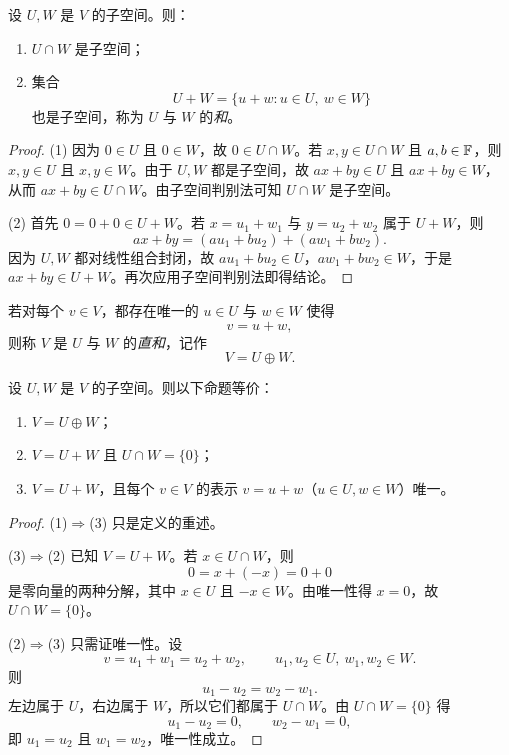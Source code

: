 \begin{proposition}
设 $U,W$ 是 $V$ 的子空间。则：
\begin{enumerate}[label=\textnormal{(\arabic*)}]
  \item $U\cap W$ 是子空间；
  \item 集合
  \[
  U+W=\{u+w:u\in U,\ w\in W\}
  \]
  也是子空间，称为 $U$ 与 $W$ 的\emph{和}。
\end{enumerate}
\end{proposition}

\begin{proof}
(1) 因为 $0\in U$ 且 $0\in W$，故 $0\in U\cap W$。若 $x,y\in U\cap W$ 且 $a,b\in\mathbb{F}$，则 $x,y\in U$ 且 $x,y\in W$。由于 $U,W$ 都是子空间，故 $ax+by\in U$ 且 $ax+by\in W$，从而 $ax+by\in U\cap W$。由子空间判别法可知 $U\cap W$ 是子空间。

(2) 首先 $0=0+0\in U+W$。若 $x=u_1+w_1$ 与 $y=u_2+w_2$ 属于 $U+W$，则
\[
ax+by=(au_1+bu_2)+(aw_1+bw_2).
\]
因为 $U,W$ 都对线性组合封闭，故 $au_1+bu_2\in U$，$aw_1+bw_2\in W$，于是 $ax+by\in U+W$。再次应用子空间判别法即得结论。
\end{proof}

\begin{definition}
若对每个 $v\in V$，都存在唯一的 $u\in U$ 与 $w\in W$ 使得
\[
v=u+w,
\]
则称 $V$ 是 $U$ 与 $W$ 的\emph{直和}，记作
\[
V=U\oplus W.
\]
\end{definition}

\begin{proposition}[直和的等价刻画]
设 $U,W$ 是 $V$ 的子空间。则以下命题等价：
\begin{enumerate}[label=\textnormal{(\arabic*)}]
  \item $V=U\oplus W$；
  \item $V=U+W$ 且 $U\cap W=\{0\}$；
  \item $V=U+W$，且每个 $v\in V$ 的表示 $v=u+w$（$u\in U,w\in W$）唯一。
\end{enumerate}
\end{proposition}

\begin{proof}
(1)$\Rightarrow$(3) 只是定义的重述。

(3)$\Rightarrow$(2) 已知 $V=U+W$。若 $x\in U\cap W$，则
\[
0=x+(-x)=0+0
\]
是零向量的两种分解，其中 $x\in U$ 且 $-x\in W$。由唯一性得 $x=0$，故 $U\cap W=\{0\}$。

(2)$\Rightarrow$(3) 只需证唯一性。设
\[
v=u_1+w_1=u_2+w_2,
\qquad u_1,u_2\in U,\ w_1,w_2\in W.
\]
则
\[
u_1-u_2=w_2-w_1.
\]
左边属于 $U$，右边属于 $W$，所以它们都属于 $U\cap W$。由 $U\cap W=\{0\}$ 得
\[
u_1-u_2=0,\qquad w_2-w_1=0,
\]
即 $u_1=u_2$ 且 $w_1=w_2$，唯一性成立。
\end{proof}

